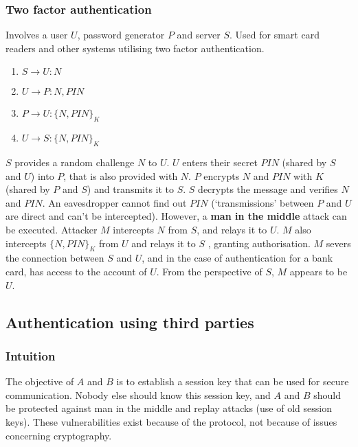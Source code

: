 \documentclass{article}
\begin{document}
\subsubsection{Two factor authentication}
Involves a user $ U $, password generator $ P $ and server $ S $. Used for smart card readers and other systems utilising two factor authentication.
\begin{enumerate}
	\item $ S \rightarrow U : N $
	\item $ U \rightarrow P : N, PIN $
	\item $ P \rightarrow U : \{ N, PIN \}_{K} $
	\item $ U \rightarrow S : \{ N, PIN \}_{K} $
\end{enumerate}
$ S $ provides a random challenge $ N $ to $ U $. $ U $ enters their secret $ PIN $ (shared by $ S $ and $ U $) into $ P $, that is also provided with $ N $. $ P $ encrypts $ N $ and $ PIN $ with $ K $ (shared by $ P $ and $ S $) and transmits it to $ S $. $ S $ decrypts the message and verifies $ N $ and $ PIN $. An eavesdropper cannot find out $ PIN $ (`transmissions' between $ P $ and $ U $ are direct and can't be intercepted). However, a \textbf{man in the middle} attack can be executed. Attacker $ M $ intercepts $ N $ from $ S $, and relays it to $ U $. $ M $ also intercepts $ \{ N, PIN \}_{K} $ from $ U $ and relays it to $ S $ , granting authorisation. $ M $ severs the connection between $ S $ and $ U $, and in the case of authentication for a bank card, has access to the account of $ U $. From the perspective of $ S $, $ M $ appears to be $ U $.

\subsection{Authentication using third parties}

\subsubsection{Intuition}
The objective of $ A $ and $ B $ is to establish a session key that can be used for secure communication. Nobody else should know this session key, and $ A $ and $ B $ should be protected against man in the middle and replay attacks (use of old session keys). These vulnerabilities exist because of the protocol, not because of issues concerning cryptography.
\end{document}
